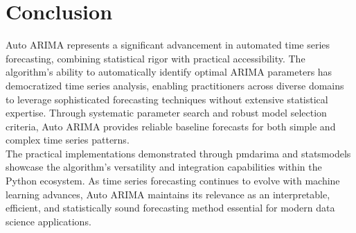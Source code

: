 \section{Conclusion}
\label{sec:conclusion}

Auto ARIMA represents a significant advancement in automated time series forecasting, combining statistical rigor with practical accessibility. The algorithm's ability to automatically identify optimal ARIMA parameters has democratized time series analysis, enabling practitioners across diverse domains to leverage sophisticated forecasting techniques without extensive statistical expertise. Through systematic parameter search and robust model selection criteria, Auto ARIMA provides reliable baseline forecasts for both simple and complex time series patterns.\\

The practical implementations demonstrated through pmdarima and statsmodels showcase the algorithm's versatility and integration capabilities within the Python ecosystem. As time series forecasting continues to evolve with machine learning advances, Auto ARIMA maintains its relevance as an interpretable, efficient, and statistically sound forecasting method essential for modern data science applications.